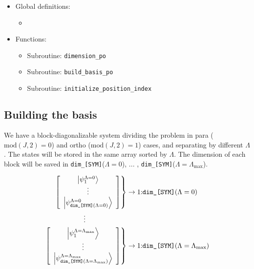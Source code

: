 \documentclass[english,twoside, openright]{report}
\begin{document}
\begin{itemize}
\item Global definitions:
  \begin{itemize}
    \item
  \end{itemize}
\item Functions:
  \begin{itemize}
  \item Subroutine: \texttt{dimension\_po}
  \item Subroutine: \texttt{build\_basis\_po}
  \item Subroutine: \texttt{initialize\_position\_index}
  \end{itemize}
\end{itemize}

\subsection{Building the basis}

We have a block-diagonalizable system dividing the problem in para
($\text{mod}(J,2)=0$) and ortho ($\text{mod}(J,2)=1$) cases, and
separating by different $\Lambda$. The states will be stored in the
same array sorted by $\Lambda$. The dimension of each block will be
saved in \texttt{dim\_[SYM]}($\Lambda=0$), ... ,
\texttt{dim\_[SYM]}($\Lambda=\Lambda_{\text{max}}$).

\begin{align}
  \left.\left[
  \begin{array}{c}
    \ket{\psi_{1}^{\Lambda=0} }\\
    \vdots \\
    \ket{\psi_{\text{\texttt{dim\_[SYM]}}(\Lambda=0)}^{\Lambda=0}}
  \end{array}
  \right]\right\}& \rightarrow \text{1:\texttt{dim\_[SYM]}}(\Lambda=0)
  \nonumber\\
  \vdots  \qquad \qquad \qquad &
  \\
  \left.\left[
  \begin{array}{c}
    \ket{\psi_{1}^{\Lambda=\Lambda_{\text{max}}} }\\
    \vdots \\
    \ket{\psi_{\text{\texttt{dim\_[SYM]}}(\Lambda=\Lambda_{\text{max}})}^{\Lambda=\Lambda_{\text{max}}}}
  \end{array}
  \right]\right\}& \rightarrow \text{1:\texttt{dim\_[SYM]}}(\Lambda=\Lambda_{\text{max}}) \nonumber
\end{align}
\end{document}
